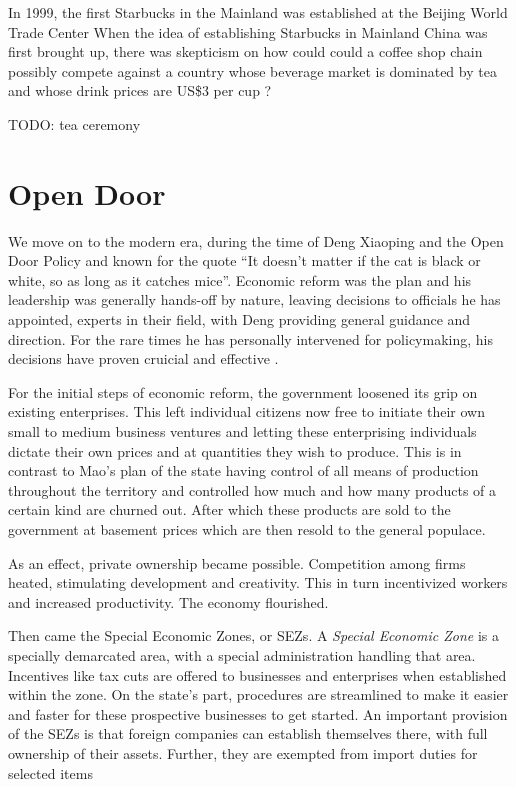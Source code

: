 In 1999, the first Starbucks in the Mainland was established at the Beijing
World Trade Center When the idea of establishing Starbucks in Mainland China was
first brought up, there was skepticism on how could could a coffee shop chain
possibly compete against a country whose beverage market is dominated by tea and
whose drink prices are US\$3 per cup \autocite{adamy_eyeing_2006}?


TODO: tea ceremony

\section{Open Door}


We move on to the modern era, during the time of Deng Xiaoping and the Open Door
Policy and known for the quote ``It doesn't matter if the cat is black or white, so
as long as it catches mice''. Economic reform was the plan and his leadership
was generally hands-off by nature, leaving decisions to officials he has
appointed, experts in their field, with Deng providing general guidance and
direction. For the rare times he has personally intervened for policymaking, his
decisions have proven cruicial and effective \autocite{naughton_deng_1993}.

For the initial steps of economic reform, the government loosened its grip on
existing enterprises. This left individual citizens now free to initiate their own
small to medium business ventures and letting these enterprising individuals dictate
their own prices and at quantities they wish to produce. This is in contrast to
Mao's plan of the state having control of all means of production throughout the
territory and controlled how much and how many products of a certain kind are
churned out. After which these products are sold to the government at basement
prices which are then resold to the general populace.

As an effect, private ownership became possible. Competition among firms heated,
stimulating development and creativity. This in turn incentivized workers and
increased productivity. The economy flourished.


Then came the Special Economic Zones, or SEZs. A \emph{Special Economic Zone} is a
specially demarcated area, with a special administration handling that area.
Incentives like tax cuts are offered to businesses and enterprises when
established within the zone. On the state's part, procedures are streamlined to
make it easier and faster for these prospective businesses to get started.
An important provision of the SEZs is that foreign companies can establish
themselves there, with full ownership of their assets. Further, they are
exempted from import duties for selected items
\autocites{zeng_how_2011}{jaggi_chinas_1996}

